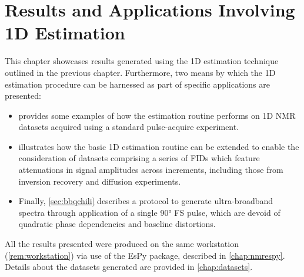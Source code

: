 \chapter{Results and Applications Involving 1D Estimation}
\label{chap:results}

This chapter showcases results generated using the \ac{1D} estimation
technique outlined in the previous chapter. Furthermore, two means by
which the \ac{1D} estimation procedure can be harnessed as part of
specific applications are presented:
\begin{itemize}
    \item {} provides some examples of how the estimation
        routine performs on \ac{1D} \ac{NMR} datasets acquired using a standard
        pulse-acquire experiment.
    \item {} illustrates how the basic \ac{1D} estimation routine can be
        extended to enable the consideration of datasets comprising a series of
        \acp{FID} which feature attenuations in signal amplitudes across increments,
        including those from inversion recovery and diffusion experiments.
    \item Finally,
        \cref{sec:bbqchili} describes a protocol to generate ultra-broadband spectra
        through application of a single \ang{90} \acl{FS} pulse, which are devoid of
        quadratic phase dependencies and baseline distortions.
\end{itemize}

All the results presented were produced on the same workstation
(\cref{rem:workstation}) via use of the \ac{EsPy} package,
described in \cref{chap:nmrespy}. Details about the datasets generated are
provided in \cref{chap:datasets}.





